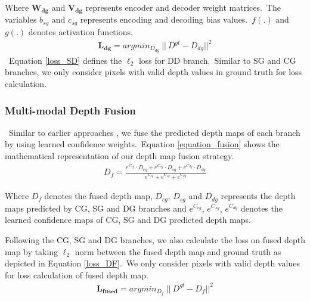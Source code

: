 \documentclass{ieeeaccess}
\begin{document}
Where $\mathbf{W_{dg}}$ and $\mathbf{V_{dg}}$ represents encoder and decoder weight matrices.~The variables $b_{sg}$ and $c_{sg}$ represents encoding and decoding bias values.~$f(.)$ and $g(.)$ denotes activation functions.
\begin{equation}
    \begin{aligned}
            \mathbf{L_{dg}} =   argmin_{D_{dg}} \ || \ D ^{gt} - D_{dg} ||^2
    \end{aligned}
    \label{loss_SD}
\end{equation}
~Equation \ref{loss_SD} defines the $\ell_2$ loss for DD branch.~Similar to SG and CG branches, we only consider pixels with valid depth values in ground truth for loss calculation.


\subsubsection{Multi-modal Depth Fusion}
~Similar to earlier approaches \cite{hu2020PENet, vangansbeke2019sparse}, we fuse the predicted depth maps of each branch by using learned confidence weights.~Equation \ref{equation_fusion} shows the mathematical representation of our depth map fusion strategy.
 \begin{equation}
     \begin{aligned}
             D_f =  \frac{ e^{C_{cg}} \cdot D_{cg} + e^{C_{sg}} \cdot D_{sg} + e^{C_{dg}} \cdot D_{dg}  } { e^{C_{cg}} + e^{C_{sg}} + e^{C_{dg}} } 
     \end{aligned}
     \label{equation_fusion}
 \end{equation}

Where $D_f$ denotes the fused depth map, $D_{cg}$, $D_{sg}$ and $D_{dg}$ represents the depth maps predicted by CG, SG and DG branches and $e^{C_{cg}}$, $e^{C_{sg}}$, $e^{C_{dg}}$ denotes the learned confidence maps of CG, SG and DG predicted depth maps.

Following the CG, SG and DG branches, we also calculate the loss on fused depth map by taking $\ell_2$ norm between the fused depth map and ground truth as depicted in Equation \ref{loss_DF}.~We only consider pixels with valid depth values for loss calculation of fused depth map. 
\begin{equation}
    \begin{aligned}
            \mathbf{L_{fused}} =   argmin_{D_{f}} \ || \ D ^{gt} - D_{f} ||^2
    \end{aligned}
    \label{loss_DF}
\end{equation}
\end{document}
